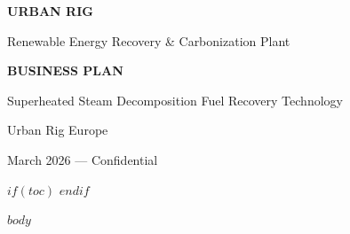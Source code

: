 \documentclass[12pt,a4paper]{scrartcl}
\author{$for(author)$$author$$sep$ \and $endfor$}
\date{$date$}
\begin{document}

\begin{titlepage}
\centering

\vspace*{3cm}

{\Huge\bfseries URBAN RIG\par}

\vspace{0.8cm}

{\Large Renewable Energy Recovery \& Carbonization Plant\par}

\vspace{1.5cm}

{\Large\bfseries BUSINESS PLAN\par}

\vspace{1.2cm}

{\large Superheated Steam Decomposition Fuel Recovery Technology\par}

\vspace{1.8cm}

{\large Urban Rig Europe\par}

\vspace{0.5cm}

{\large March 2026 --- Confidential\par}

\vfill

\end{titlepage}

\newpage


$if(toc)$
\tableofcontents
\newpage
$endif$


$body$
\end{document}
